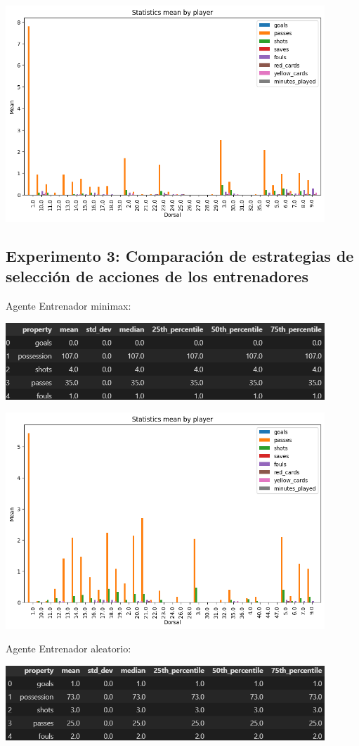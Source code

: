 \documentclass{article}
\begin{document}
\includegraphics[width=0.9\textwidth,height=0.5\textwidth]{images/smart_vs_random_line_up_away.png}                       

\subsection{Experimento 3: Comparación de estrategias de selección de acciones de los entrenadores}
Agente Entrenador minimax:

\includegraphics[width=0.9\textwidth]{images/tabla5.PNG}

\includegraphics[width=0.9\textwidth,height=0.5\textwidth]{images/smart_vs_random_line_up_home.png}

Agente Entrenador aleatorio:

\includegraphics[width=0.9\textwidth]{images/tabla6.PNG}
\end{document}
